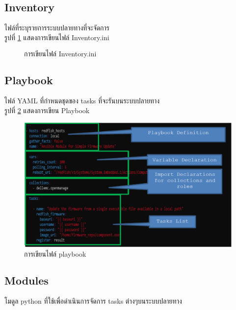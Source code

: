 \subsection{Inventory}
\hspace{0.5in} ไฟล์ที่ระบุรายการระบบปลายทางที่จะจัดการ \\
รูปที่ \ref{fig:inventory.ini} แสดงการเขียนไฟล์ Inventory.ini

\begin{figure}
  \centering
  \caption[การเขียนไฟล์ Inventory.ini]{การเขียนไฟล์ Inventory.ini}
  \label{fig:inventory.ini}
\end{figure}

\subsection{Playbook}
\hspace{0.5in} ไฟล์ YAML ที่กำหนดชุดของ tasks ที่จะรันบนระบบปลายทาง \\
รูปที่ \ref{fig:ansible_playbook} แสดงการเขียน Playbook

\begin{figure}
  \begin{center}
    \includegraphics[scale=0.9]{playbook.png}
  \end{center}
  \caption[การเขียนไฟล์ playbook]{การเขียนไฟล์ playbook}
  \label{fig:ansible_playbook}
\end{figure}

\subsection{Modules}
\hspace{0.5in} โมดูล python ที่ใช้เพื่อดำเนินการจัดการ tasks ต่างๆบนระบบปลายทาง
